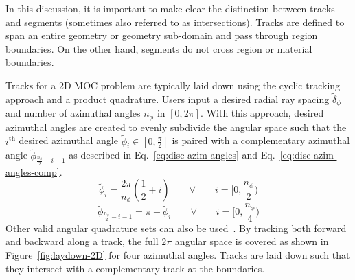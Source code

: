 In this discussion, it is important to make clear the distinction between tracks and segments (sometimes also referred to as intersections). Tracks are defined to span an entire geometry or geometry sub-domain and pass through region boundaries. On the other hand, segments do not cross region or material boundaries.

Tracks for a 2D \ac{MOC} problem are typically laid down using the cyclic tracking approach and a product quadrature. Users input a desired radial ray spacing $\tilde{\delta}_\phi$ and number of azimuthal angles $n_{\phi}$ in $[0, 2 \pi]$. With this approach, desired azimuthal angles are created to evenly subdivide the angular space such that the $i^{\text{th}}$ desired azimuthal angle $\tilde{\phi}_i \in [0, \frac{\pi}{2}]$ is paired with a complementary azimuthal angle $\tilde{\phi}_{\frac{n_{\phi}}{2} - i - 1}$ as described in Eq.~\ref{eq:disc-azim-angles} and Eq.~\ref{eq:disc-azim-angles-comp}.
\begin{equation}
\tilde{\phi}_i = \frac{2 \pi}{n_\phi} \left(\frac{1}{2} + i\right) \qquad \forall \qquad i = \Big[0,\frac{n_{\phi}}{2}\Big)
\label{eq:disc-azim-angles}
\end{equation}
\begin{equation}
\tilde{\phi}_{\frac{n_{\phi}}{2} - i - 1} = \pi - \tilde{\phi}_i \qquad \forall \qquad i= \Big[0,\frac{n_{\phi}}{4}\Big)
\label{eq:disc-azim-angles-comp}
\end{equation} 
Other valid angular quadrature sets can also be used~\cite{liu_mrt}. By tracking both forward and backward along a track, the full $2 \pi$ angular space is covered as shown in Figure~\ref{fig:laydown-2D} for four azimuthal angles. Tracks are laid down such that they intersect with a complementary track at the boundaries. 

